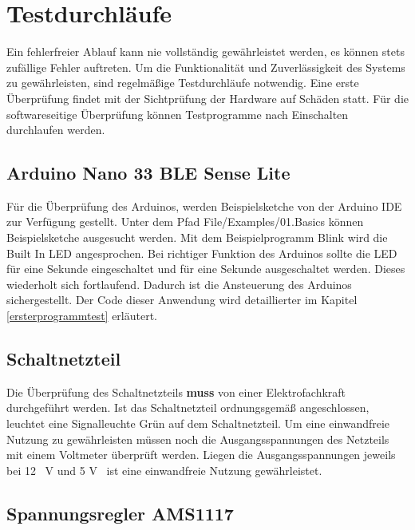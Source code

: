 %
%
%
\chapter{Testdurchläufe}

Ein fehlerfreier Ablauf kann nie vollständig gewährleistet werden, es können stets zufällige Fehler auftreten. Um die Funktionalität und Zuverlässigkeit des Systems zu gewährleisten, sind regelmäßige Testdurchläufe notwendig. Eine erste Überprüfung findet mit der Sichtprüfung der Hardware auf Schäden statt. Für die softwareseitige Überprüfung können Testprogramme nach Einschalten durchlaufen werden.  


\section{Arduino Nano 33 BLE Sense Lite}

Für die Überprüfung des Arduinos, werden Beispielsketche von der Arduino IDE zur Verfügung gestellt. Unter dem Pfad File/Examples/01.Basics können Beispielsketche ausgesucht werden. Mit dem Beispielprogramm Blink wird die Built In LED angesprochen. Bei richtiger Funktion des Arduinos sollte die LED für eine Sekunde eingeschaltet und für eine Sekunde ausgeschaltet werden. Dieses wiederholt sich fortlaufend. Dadurch ist die Ansteuerung des Arduinos sichergestellt.
Der Code dieser Anwendung wird detaillierter im Kapitel \ref{ersterprogrammtest} erläutert.

\section{Schaltnetzteil}

Die Überprüfung des Schaltnetzteils \textbf{muss} von einer Elektrofachkraft durchgeführt werden. Ist das Schaltnetzteil ordnungsgemäß angeschlossen, leuchtet eine Signalleuchte Grün auf dem Schaltnetzteil. Um eine einwandfreie Nutzung zu gewährleisten müssen noch die Ausgangsspannungen des Netzteils mit einem Voltmeter überprüft werden. Liegen die Ausgangsspannungen jeweils bei 12 \ V und 5 V \ ist eine einwandfreie Nutzung gewährleistet. 


\section{Spannungsregler AMS1117}

